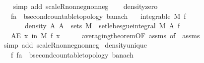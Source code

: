 \begin{isabellebody}
\ \ \isamarkupfalse%
\ {\isacharparenleft}{\kern0pt}simp\ add{\isacharcolon}{\kern0pt}\ scaleR{\isacharunderscore}{\kern0pt}nonneg{\isacharunderscore}{\kern0pt}nonneg{\isacharparenright}{\kern0pt}%
\endisatagproof
{\isafoldproof}%
%
\isadelimproof
\isanewline
%
\endisadelimproof
\ \ \isanewline
{}\isamarkupfalse%
\ density{\isacharunderscore}{\kern0pt}zero{\isacharcolon}{\kern0pt}\isanewline
\ \ \ f{\isacharcolon}{\kern0pt}{\isacharcolon}{\kern0pt}{\isachardoublequoteopen}{\isacharprime}{\kern0pt}a\ {\isasymRightarrow}\ {\isacharprime}{\kern0pt}b{\isacharcolon}{\kern0pt}{\isacharcolon}{\kern0pt}{\isacharbraceleft}{\kern0pt}second{\isacharunderscore}{\kern0pt}countable{\isacharunderscore}{\kern0pt}topology{\isacharcomma}{\kern0pt}\ banach{\isacharbraceright}{\kern0pt}{\isachardoublequoteclose}\isanewline
\ \ \ {\isachardoublequoteopen}integrable\ M\ f{\isachardoublequoteclose}\isanewline
\ \ \ \ \ \ \ density{\isacharunderscore}{\kern0pt}{}{\isacharcolon}{\kern0pt}\ {\isachardoublequoteopen}{\isasymAnd}A{\isachardot}{\kern0pt}\ A\ {\isasymin}\ sets\ M\ {\isasymLongrightarrow}\ set{\isacharunderscore}{\kern0pt}lebesgue{\isacharunderscore}{\kern0pt}integral\ M\ A\ f\ {\isacharequal}{\kern0pt}\ {}{\isachardoublequoteclose}\isanewline
\ \ \ {\isachardoublequoteopen}AE\ x\ in\ M{\isachardot}{\kern0pt}\ f\ x\ {\isacharequal}{\kern0pt}\ {}{\isachardoublequoteclose}\isanewline
%
\isadelimproof
\ \ %
\endisadelimproof
%
\isatagproof
{}\isamarkupfalse%
\ averaging{\isacharunderscore}{\kern0pt}theorem{\isacharbrackleft}{\kern0pt}OF\ assms{\isacharparenleft}{\kern0pt}{}{\isacharparenright}{\kern0pt}{\isacharcomma}{\kern0pt}\ of\ {\isachardoublequoteopen}{\isacharbraceleft}{\kern0pt}{}{\isacharbraceright}{\kern0pt}{\isachardoublequoteclose}{\isacharbrackright}{\kern0pt}\ assms{\isacharparenleft}{\kern0pt}{}{\isacharparenright}{\kern0pt}\isanewline
\ \ \isamarkupfalse%
\ {\isacharparenleft}{\kern0pt}simp\ add{\isacharcolon}{\kern0pt}\ scaleR{\isacharunderscore}{\kern0pt}nonneg{\isacharunderscore}{\kern0pt}nonneg{\isacharparenright}{\kern0pt}%
\endisatagproof
{\isafoldproof}%
%
\isadelimproof
\isanewline
%
\endisadelimproof
\isanewline
{}\isamarkupfalse%
\ density{\isacharunderscore}{\kern0pt}unique{\isacharcolon}{\kern0pt}\isanewline
\ \ \ f\ f{\isacharprime}{\kern0pt}{\isacharcolon}{\kern0pt}{\isacharcolon}{\kern0pt}{\isachardoublequoteopen}{\isacharprime}{\kern0pt}a\ {\isasymRightarrow}\ {\isacharprime}{\kern0pt}b{\isacharcolon}{\kern0pt}{\isacharcolon}{\kern0pt}{\isacharbraceleft}{\kern0pt}second{\isacharunderscore}{\kern0pt}countable{\isacharunderscore}{\kern0pt}topology{\isacharcomma}{\kern0pt}\ banach{\isacharbraceright}{\kern0pt}{\isachardoublequoteclose}\isanewline

\end{isabellebody}
